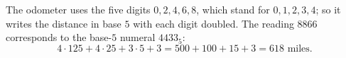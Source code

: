 The odometer uses the five digits $0,2,4,6,8$, which stand for $0,1,2,3,4$; so it writes the distance in base $5$ with each digit doubled. The reading $8866$ corresponds to the base-$5$ numeral $4433_5$:
\[
4\cdot125+4\cdot25+3\cdot5+3=500+100+15+3=\boxed{618}\text{ miles}.
\]
